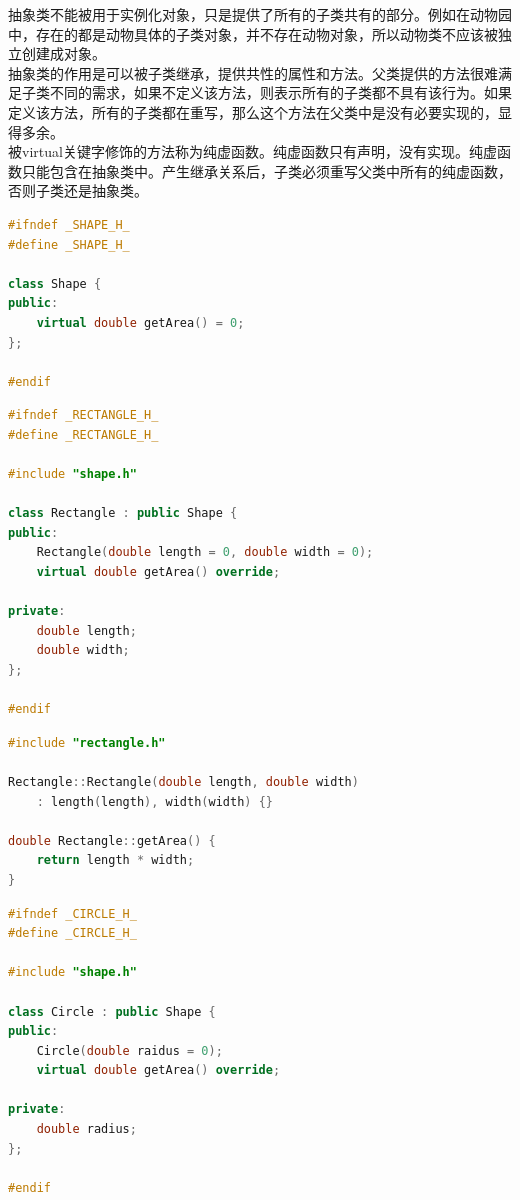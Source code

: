 抽象类不能被用于实例化对象，只是提供了所有的子类共有的部分。例如在动物园中，存在的都是动物具体的子类对象，并不存在动物对象，所以动物类不应该被独立创建成对象。 \\

抽象类的作用是可以被子类继承，提供共性的属性和方法。父类提供的方法很难满足子类不同的需求，如果不定义该方法，则表示所有的子类都不具有该行为。如果定义该方法，所有的子类都在重写，那么这个方法在父类中是没有必要实现的，显得多余。 \\

被virtual关键字修饰的方法称为纯虚函数。纯虚函数只有声明，没有实现。纯虚函数只能包含在抽象类中。产生继承关系后，子类必须重写父类中所有的纯虚函数，否则子类还是抽象类。 \\


\begin{lstlisting}[language=C++, title=shape.h]
#ifndef _SHAPE_H_
#define _SHAPE_H_

class Shape {
public:
	virtual double getArea() = 0;
};

#endif
\end{lstlisting}

\begin{lstlisting}[language=C++, title=rectangle.h]
#ifndef _RECTANGLE_H_
#define _RECTANGLE_H_

#include "shape.h"

class Rectangle : public Shape {
public:
	Rectangle(double length = 0, double width = 0);
	virtual double getArea() override;

private:
	double length;
	double width;
};

#endif
\end{lstlisting}

\begin{lstlisting}[language=C++, title=rectangle.cpp]
#include "rectangle.h"

Rectangle::Rectangle(double length, double width)
	: length(length), width(width) {}

double Rectangle::getArea() {
	return length * width;
}
\end{lstlisting}

\begin{lstlisting}[language=C++, title=circle.h]
#ifndef _CIRCLE_H_
#define _CIRCLE_H_

#include "shape.h"

class Circle : public Shape {
public:
	Circle(double raidus = 0);
	virtual double getArea() override;

private:
	double radius;
};

#endif
\end{lstlisting}

